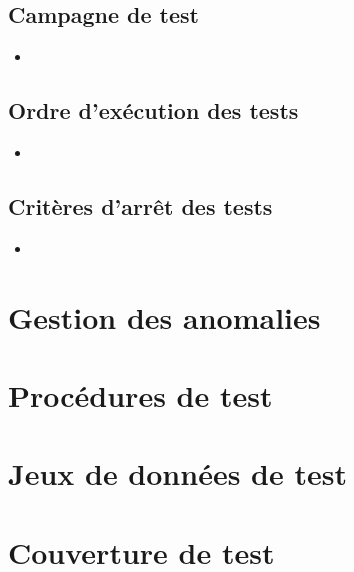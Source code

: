 \documentclass{../res/univ-projet}
\begin{document}
\subsection{Campagne de test}
\begin{itemize}
 \item 
\end{itemize}

\subsection{Ordre d'exécution des tests}
\begin{itemize}
 \item 
\end{itemize}

\subsection{Critères d'arrêt des tests}
\begin{itemize}
 \item 
\end{itemize}


\section{Gestion des anomalies}



\section{Procédures de test}



\section{Jeux de données de test}

\section{Couverture de test}
\end{document}
